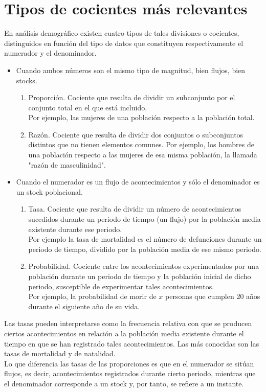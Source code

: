 \section{Tipos de cocientes más relevantes}
En análisis demográfico existen cuatro tipos de tales divisiones o cocientes, distinguidos en función del tipo de datos que constituyen respectivamente el numerador y el denominador.
\begin{itemize}
    \item Cuando ambos números son el mismo tipo de magnitud, bien flujos, bien stocks.
    \begin{enumerate}
        \item Proporción. Cociente que resulta de dividir un subconjunto por el conjunto total en el que está incluido.\\
        Por ejemplo, las mujeres de una población respecto a la población total.
        \item Razón. Cociente que resulta de dividir dos conjuntos o subconjuntos distintos que no tienen elementos comunes. Por ejemplo, los hombres de una población respecto a las mujeres de esa misma población, la llamada "razón de masculinidad".
    \end{enumerate}
    \item Cuando el numerador es un flujo de acontecimientos y sólo el denominador es un stock poblacional.
    \begin{enumerate}
        \item Tasa. Cociente que resulta de dividir un número de acontecimientos sucedidos durante un periodo de tiempo (un flujo) por la población media existente durante ese periodo.\\Por ejemplo la tasa de mortalidad es el número de defunciones durante un periodo de tiempo, dividido por la población media de ese mismo periodo.
        \item Probabilidad. Cociente entre los acontecimientos experimentados por una población durante un periodo de tiempo y la población inicial de dicho periodo, susceptible de experimentar tales acontecimientos.\\Por ejemplo, la probabilidad de morir de $x$ personas que cumplen 20 años durante el siguiente año de su vida.
    \end{enumerate}
\end{itemize}
Las tasas pueden interpretarse como la frecuencia relativa con que se producen ciertos acontecimientos en relación a la población media existente durante el tiempo en que se han registrado tales acontecimientos. Las más conocidas son las tasas de mortalidad y de natalidad.\\Lo que diferencia las tasas de las proporciones es que en el numerador se sitúan flujos, es decir, acontecimientos registrados durante cierto periodo, mientras que el denominador corresponde a un stock y, por tanto, se refiere a un instante.
